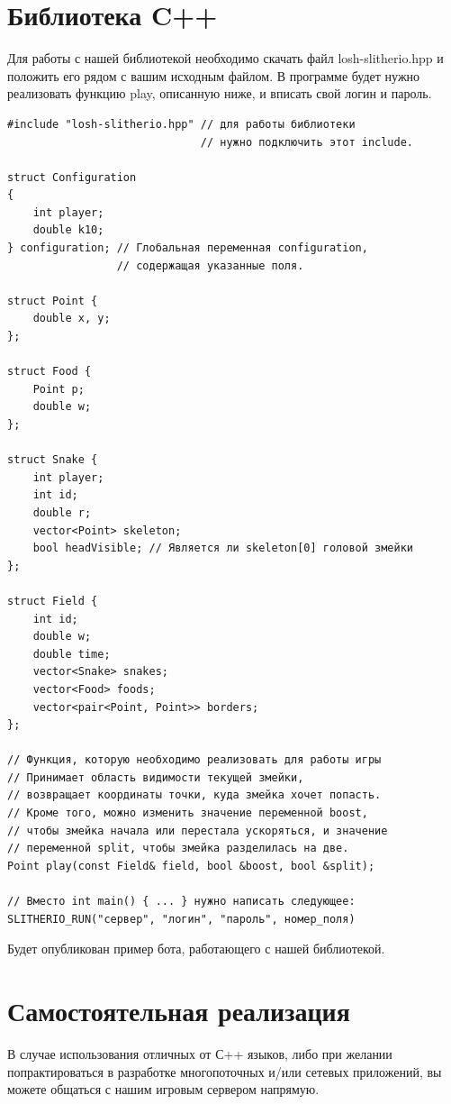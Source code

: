 \documentclass[12pt, a4paper]{article}
\begin{document}
{\section{Библиотека C++}}

Для работы с нашей библиотекой необходимо скачать файл losh-slitherio.hpp и положить его рядом с вашим исходным файлом. В программе будет нужно реализовать функцию play, описанную ниже, и вписать свой логин и пароль.

\begin{verbatim}
#include "losh-slitherio.hpp" // для работы библиотеки
                              // нужно подключить этот include.

struct Configuration
{
	int player;
	double k10;
} configuration; // Глобальная переменная configuration,
                 // содержащая указанные поля.

struct Point {
    double x, y;
};

struct Food {
	Point p;
	double w;
};

struct Snake {
    int player;
    int id;
    double r;
    vector<Point> skeleton;
    bool headVisible; // Является ли skeleton[0] головой змейки
};

struct Field {
    int id;
    double w;
    double time;
    vector<Snake> snakes;
    vector<Food> foods;
    vector<pair<Point, Point>> borders;
};

// Функция, которую необходимо реализовать для работы игры
// Принимает область видимости текущей змейки,
// возвращает координаты точки, куда змейка хочет попасть.
// Кроме того, можно изменить значение переменной boost,
// чтобы змейка начала или перестала ускоряться, и значение 
// переменной split, чтобы змейка разделилась на две.
Point play(const Field& field, bool &boost, bool &split);

// Вместо int main() { ... } нужно написать следующее:
SLITHERIO_RUN("сервер", "логин", "пароль", номер_поля)
\end{verbatim}

Будет опубликован пример бота, работающего с нашей библиотекой.

{\section{Самостоятельная реализация}}

В случае использования отличных от С++ языков, либо при желании попрактироваться в разработке многопоточных и/или сетевых приложений, вы можете общаться с нашим игровым сервером напрямую.
\end{document}
